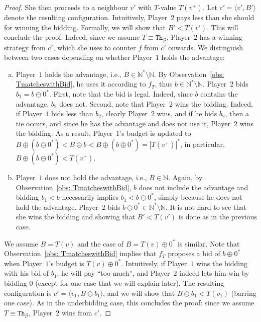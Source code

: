 \documentclass{article}\providecommand{\nequiv}{\not\equiv}\usepackage[a4paper,margin=20mm]{geometry}
\newcommand{\PO}{Player~$1$\xspace}
\newcommand{\PT}{Player~$2$\xspace}
\newcommand{\G}{{\mathcal G}}
\newcommand{\Nat}{\mathbb{N}}
\newcommand{\Natstro}{\mathbb{N}^* \setminus \mathbb{N}}
\newcommand{\thresh}{\texttt{Th}\xspace}
\newcommand{\zug}[1]{\langle #1  \rangle}
\newcommand{\succb}[1]{#1 \oplus 0^*\xspace}
\begin{document}
\begin{proof}
She then proceeds to a neighbour $v'$ with \(T\)-value \(T(v^+)\). Let $c' = \zug{v', B'}$ denote the resulting configuration. Intuitively, \PT pays less than she should for winning the bidding. Formally, we will show that $B' < T(v')$. This will conclude the proof. Indeed, since we assume $T \equiv \thresh_\G$, \PT has a winning strategy from $c'$, which she uses to counter $f$ from \(c'\) onwards. 
We distinguish between two cases depending on whether \PO holds the advantage:
\begin{enumerate}[(a)]
	\item \PO holds the advantage, i.e., \(B \in \Natstro\). By Observation~\ref{obs: TmatcheswithBid}, he uses it according to \(f_T\), thus \(b \in \Natstro\). 
	\PT bids $b_2 = b \ominus 0^*$. 
	First, note that the bid is legal. Indeed, since $b$ contains the advantage, $b_2$ does not. 
	Second, note that \PT wins the bidding. 
	Indeed, if \PO bids less than $b_2$, clearly \PT wins, and if he bids $b_2$, then a tie occurs, and since he has the advantage and does not use it, \PT wins the bidding. 
	As a result, \PO's budget is updated to \(B \oplus (b \ominus 0^*) < B \oplus b < B \oplus (\succb{b}) = |T(v^+)|^*\), in particular, \(B \oplus (b \ominus 0^*) < T(v^+)\). 
	
	\item \PO does not hold the advantage, i.e., \(B \in \Nat\). Again, by Observation~\ref{obs: TmatcheswithBid}, $b$ does not include the advantage and bidding \(b_1 < b\) necessarily implies \(b_1 < b \ominus 0^*\), simply because he does not hold the advantage. 
 \PT bids \(b \ominus 0^* \in \Natstro\). It is not hard to see that she wins the bidding and showing that $B' < T(v')$ is done as in the previous case. 
\end{enumerate}


We assume \(B = T(v)\) and the case of \(B = \succb{T(v)}\) is similar. Note that Observation~\ref{obs: TmatcheswithBid} implies that $f_T$ proposes a bid of \(\succb{b}\) when \PO's budget is \(\succb{T(v)}\). 
Intuitively, if \PO wins the bidding with his bid of $b_1$, he will pay ``too much'', and \PT indeed lets him win by bidding $0$ (except for one case that we will explain later). 
The resulting configuration is \(c' = \zug{v_1, B \ominus b_1}\), and we will show that \(B \ominus b_1 < T(v_1)\) (barring one case). As in the underbidding  case, this concludes the proof: since we assume $T \equiv \thresh_\G$, \PT wins from $c'$. 


\end{proof}
\end{document}
